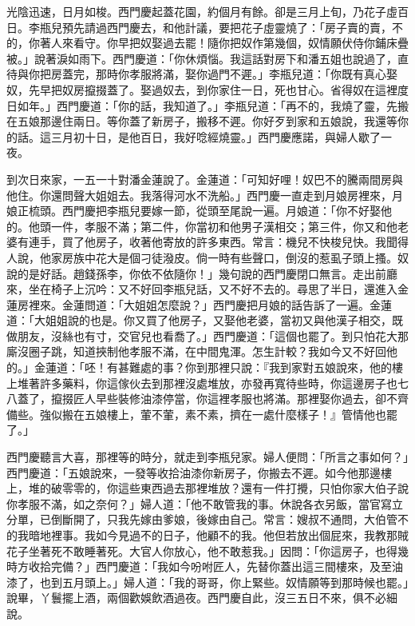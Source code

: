 光陰迅速，日月如梭。西門慶起蓋花園，約個月有餘。卻是三月上旬，乃花子虛百日。李瓶兒預先請過西門慶去，和他計議，要把花子虛靈燒了：「房子賣的賣，不的，你著人來看守。你早把奴娶過去罷！隨你把奴作第幾個，奴情願伏侍你鋪床疊被。」說著淚如雨下。西門慶道：「你休煩惱。我這話對房下和潘五姐也說過了，直待與你把房蓋完，那時你孝服將滿，娶你過門不遲。」李瓶兒道：「你既有真心娶奴，先早把奴房攛掇蓋了。娶過奴去，到你家住一日，死也甘心。省得奴在這裡度日如年。」西門慶道：「你的話，我知道了。」李瓶兒道：「再不的，我燒了靈，先搬在五娘那邊住兩日。等你蓋了新房子，搬移不遲。你好歹到家和五娘說，我還等你的話。這三月初十日，是他百日，我好唸經燒靈。」西門慶應諾，與婦人歇了一夜。

到次日來家，一五一十對潘金蓮說了。金蓮道：「可知好哩！奴巴不的騰兩間房與他住。你還問聲大姐姐去。我落得河水不洗船。」西門慶一直走到月娘房裡來，月娘正梳頭。西門慶把李瓶兒要嫁一節，從頭至尾說一遍。月娘道：「你不好娶他的。他頭一件，孝服不滿；第二件，你當初和他男子漢相交；第三件，你又和他老婆有連手，買了他房子，收著他寄放的許多東西。常言：機兒不快梭兒快。我聞得人說，他家房族中花大是個刁徒潑皮。倘一時有些聲口，倒沒的惹虱子頭上搔。奴說的是好話。趙錢孫李，你依不依隨你！」幾句說的西門慶閉口無言。走出前廳來，坐在椅子上沉吟：又不好回李瓶兒話，又不好不去的。尋思了半日，還進入金蓮房裡來。金蓮問道：「大姐姐怎麼說？」西門慶把月娘的話告訴了一遍。金蓮道：「大姐姐說的也是。你又買了他房子，又娶他老婆，當初又與他漢子相交，既做朋友，沒絲也有寸，交官兒也看喬了。」西門慶道：「這個也罷了。到只怕花大那廝沒圈子跳，知道挾制他孝服不滿，在中間鬼渾。怎生計較？我如今又不好回他的。」金蓮道：「呸！有甚難處的事？你到那裡只說：『我到家對五娘說來，他的樓上堆著許多藥料，你這傢伙去到那裡沒處堆放，亦發再寬待些時，你這邊房子也七八蓋了，攛掇匠人早些裝修油漆停當，你這裡孝服也將滿。那裡娶你過去，卻不齊備些。強似搬在五娘樓上，葷不葷，素不素，擠在一處什麼樣子！』管情他也罷了。」

西門慶聽言大喜，那裡等的時分，就走到李瓶兒家。婦人便問：「所言之事如何？」西門慶道：「五娘說來，一發等收拾油漆你新房子，你搬去不遲。如今他那邊樓上，堆的破零零的，你這些東西過去那裡堆放？還有一件打攪，只怕你家大伯子說你孝服不滿，如之奈何？」婦人道：「他不敢管我的事。休說各衣另飯，當官寫立分單，已倒斷開了，只我先嫁由爹娘，後嫁由自己。常言：嫂叔不通問，大伯管不的我暗地裡事。我如今見過不的日子，他顧不的我。他但若放出個屁來，我教那賊花子坐著死不敢睡著死。大官人你放心，他不敢惹我。」因問：「你這房子，也得幾時方收拾完備？」西門慶道：「我如今吩咐匠人，先替你蓋出這三間樓來，及至油漆了，也到五月頭上。」婦人道：「我的哥哥，你上緊些。奴情願等到那時候也罷。」說畢，丫鬟擺上酒，兩個歡娛飲酒過夜。西門慶自此，沒三五日不來，俱不必細說。

